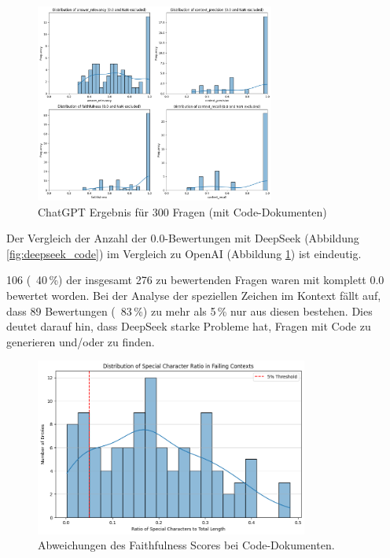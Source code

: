 \begin{figure}[htbp]
    \centering
    \includegraphics[width=0.7\textwidth]{images/127_44_code_invest_O_O.png}
    \caption{ChatGPT Ergebnis für 300 Fragen (mit Code-Dokumenten)}
    \label{fig:chatgpt_code}
\end{figure}
Der Vergleich der Anzahl der 0.0-Bewertungen mit DeepSeek (Abbildung \ref{fig:deepseek_code}) im Vergleich zu OpenAI (Abbildung \ref{fig:chatgpt_code}) ist eindeutig.

106 (~40\,\%) der insgesamt 276 zu bewertenden Fragen waren mit komplett 0.0 bewertet worden. Bei der Analyse der speziellen Zeichen im Kontext fällt auf, dass 89 Bewertungen (~83\,\%) zu mehr als 5\,\% nur aus diesen bestehen. Dies deutet darauf hin, dass DeepSeek starke Probleme hat, Fragen mit Code zu generieren und/oder zu finden.
\begin{figure}[htbp]
    \centering
    \includegraphics[width=0.8\textwidth]{images/3_3_special_characters.png}
    \caption{Abweichungen des Faithfulness Scores bei Code-Dokumenten.}
    \label{fig:special_characters}
\end{figure}

